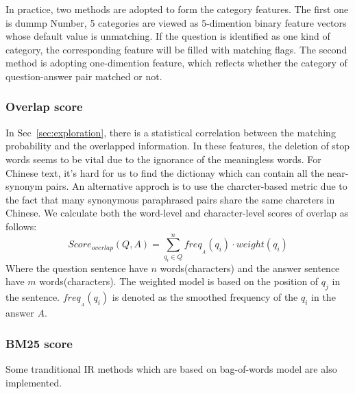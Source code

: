 \documentclass{llncs}
\begin{document}
In practice, two methods are adopted to form the category features. The first one is dummp Number, 5 categories are viewed as 5-dimention binary feature vectors whose default value is unmatching. If the question is identified as one kind of category, the corresponding feature will be filled with matching flags. 
The second method is adopting one-dimention feature, which reflects whether the category of question-answer pair matched or not.


\subsubsection{Overlap score}
In Sec~\ref{sec:exploration}, there is a statistical correlation between the matching probability and the overlapped information. 
In these features, the deletion of stop words seems to be vital due to the ignorance of the meaningless words. For Chinese text, it's hard for us to find the dictionay which can contain all the near-synonym pairs. An alternative approch is to use the charcter-based metric due to the fact that many synonymous paraphrased pairs share the same charcters in Chinese. We calculate both the word-level and character-level scores of overlap as follows:
\begin{equation}
Score_{overlap}(Q,A)=\sum_{q_i \in Q}^n freq_{_A}(q_i)\cdot weight(q_i)  
\label{eq:overlap}
\end{equation}
Where the question sentence have $n$ words(characters) and the answer sentence have $m$ words(characters). The weighted model is based on the position of $q_j$ in the sentence. %
$freq_{_A}(q_i)$ is denoted as the smoothed frequency of the $q_i$ in the answer $A$.


\subsubsection{BM25 score}
Some tranditional IR methods which are based on bag-of-words model are also implemented.
\end{document}
